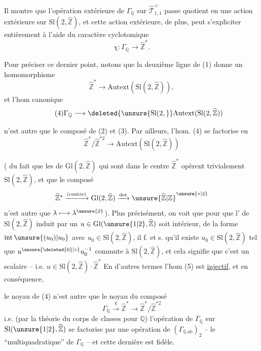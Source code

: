 Il montre que l'opération extérieure de
$\Gamma_{\mathbb Q}$ sur $\widehat{\mathcal T}_{1,1}^{+}$
passe  quotient en une
action extérieure sur $\mathrm{Sl}(2,\widehat{\mathbb Z})$, et cette
action extérieure, de plus, peut s'expliciter
entièrement à l'aide du caractère
cyclotomique
\[
\tag{2}
\chi : \Gamma_{\mathbb Q}\longrightarrow \widehat{\mathbb Z}^{*}.
\]

Pour préciser ce dernier point, notons
que la deuxième ligne de (1) donne
un homomorphisme
\[
\tag{3}
\widehat{\mathbb Z}^{*}\longrightarrow
\mathrm{Autext}(\mathrm{Sl}(2,\widehat{\mathbb Z})),
\]
et l'hom canonique
\[
\tag{4}
\Gamma_{\mathbb Q}\longrightarrow
\deleted{\unsure{\mathrm{Sl}(2,}}
\mathrm{Autext}(\mathrm{Sl}(2,\widehat{\mathbb Z}))
\]


n'est autre que le composé de (2) et (3).
Par ailleurs, l'hom. (4) se factorise
en
\[
\tag{5}
\widehat{\mathbb Z}^{*}/\widehat{\mathbb Z}^{*2}
\longrightarrow \mathrm{Autext}(\mathrm{Sl}(2,\widehat{\mathbb Z}))
\]

( du fait que les  de
$\mathrm{Gl}(2,\widehat{\mathbb Z})$ qui sont dans le centre
$\widehat{\mathbb Z}^{*}$ opèrent trivialement
 $\mathrm{Sl}(2,\widehat{\mathbb Z})$,
et que le composé
\[
\widehat{\mathbb Z}^{*}\xrightarrow{\text{(centre)}}
\mathrm{Gl}(2,\widehat{\mathbb Z})\xrightarrow{\det}
\unsure{\widehat{\mathbb Z}|\mathbb Z}^{\unsure{*|2}}
\]
n'est autre que $\lambda\longmapsto\lambda^{\unsure{2}}$). Plus
précisément, on voit que pour que l'
 de $\mathrm{Sl}(2,\widehat{\mathbb Z})$ induit par un
$u\in\mathrm{Gl}(\unsure{1|2},\widehat{\mathbb Z})$ soit intérieur,
 de la forme
$\mathrm{int}\,\unsure{(u_0)|u_0}$ avec $u_0\in\mathrm{Sl}(2,\widehat{\mathbb Z})$, il f. et s.
qu'il existe $u_0\in\mathrm{Sl}(2,\widehat{\mathbb Z})$ tel que
$u^{\unsure{\deleted{0}|\circ}}u_0^{-1}$ commute à $\mathrm{Sl}(2,\widehat{\mathbb Z})$, et cela signifie
que c'est un scalaire -- i.e.
$u\in\mathrm{Sl}(2,\widehat{\mathbb Z})\cdot\widehat{\mathbb Z}^{*}$
En d'autres termes
l'hom (5) est \uline{injectif}, et en conséquence,


le noyau de (4) n'est autre que le
noyau du composé
\[
\tag{6}
\Gamma_{\mathbb Q}\xrightarrow{\chi}\widehat{\mathbb Z}^{*}
\longrightarrow\widehat{\mathbb Z}^{*}/\widehat{\mathbb Z}^{*2}
\]
i.e. (par la théorie du corps de classes pour
$\mathbb Q$) l'opération  de $\Gamma_{\mathbb Q}$ sur
$\mathrm{Sl}(\unsure{1|2},\widehat{\mathbb Z})$ se
factorise par une opération  de
$(\Gamma_{\mathbb Q\,\mathrm{ab}})_2$ -- le
 ``multiquadratique'' de $\Gamma_{\mathbb Q}$ -- et cette
dernière est fidèle.

